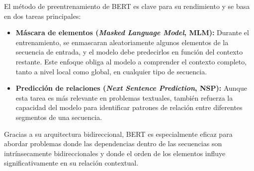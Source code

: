 El método de preentrenamiento de BERT es clave para su rendimiento y se basa en dos tareas principales:

\begin{itemize}
    \item \textbf{Máscara de elementos (\textit{Masked Language Model}, MLM):} Durante el entrenamiento, se enmascaran aleatoriamente algunos elementos de la secuencia de entrada, y el modelo debe predecirlos en función del contexto restante. Este enfoque obliga al modelo a comprender el contexto completo, tanto a nivel local como global, en cualquier tipo de secuencia.
    
    \item \textbf{Predicción de relaciones (\textit{Next Sentence Prediction}, NSP):} Aunque esta tarea es más relevante en problemas textuales, también refuerza la capacidad del modelo para identificar patrones de relación entre diferentes segmentos de una secuencia.
\end{itemize}

Gracias a su arquitectura bidireccional, BERT es especialmente eficaz para abordar problemas donde las dependencias dentro de las secuencias son intrínsecamente bidireccionales y donde el orden de los elementos influye significativamente en su relación contextual.



